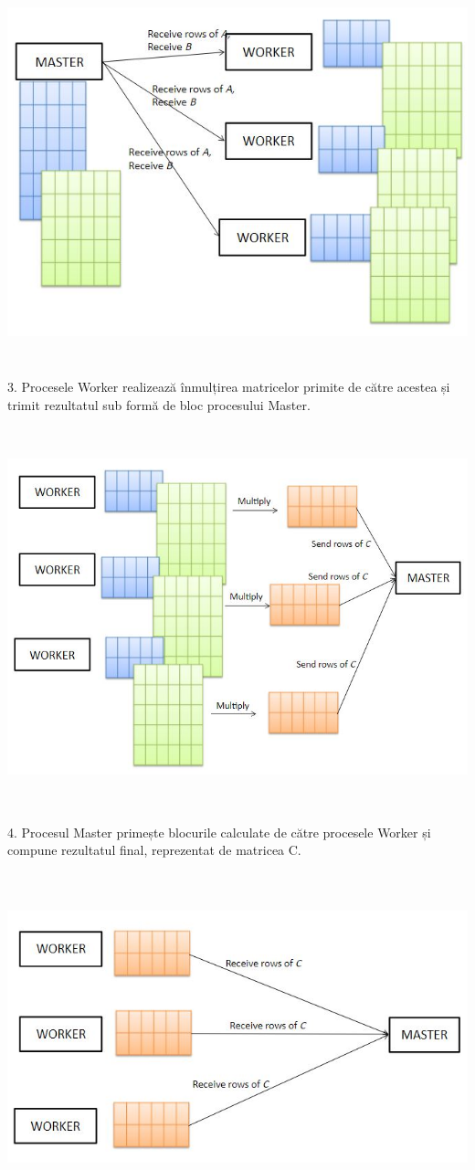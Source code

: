 \documentclass[a4paper,12pt]{report}
\newcommand\tab[1][1cm]{\hspace*{#1}}
\begin{document}
\begin{center}
	\includegraphics[width=16cm, height=11cm]{4.jpg}
\end{center}
\tab 3. Procesele Worker realizează înmulțirea matricelor primite de către acestea și trimit rezultatul sub formă de bloc procesului Master.
\begin{center}
	\includegraphics[width=16cm, height=11cm]{5.jpg}
\end{center}
\tab 4. Procesul Master primește blocurile calculate de către procesele Worker și compune rezultatul final, reprezentat de matricea C.
\begin{center}
	\includegraphics[width=16cm, height=9.5cm]{6.jpg}
\end{center}
\vspace {3cm}
\end{document}
